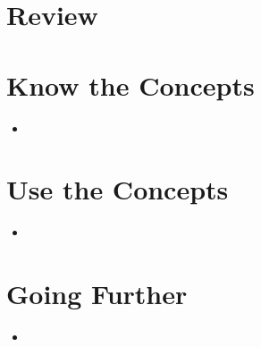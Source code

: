 % 
% 
% 
% 
% 
% 
% 
% 
% 
% 
% 

% 
% 

% 

% 
% 

\section{Review}

\section{Know the Concepts}

\begin{itemize}\item  
\end{itemize}

\section{Use the Concepts}

\begin{itemize}\item  
\end{itemize}

\section{Going Further}

\begin{itemize}\item  
\end{itemize}

